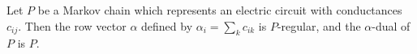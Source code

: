 Let $P$ be a Markov chain which represents an electric circuit with conductances $c_{ij}$. Then the row vector $\alpha$ defined by $\alpha_i = \sum_k c_{ik}$ is $P$-regular, and the $\alpha$-dual of $P$ is $P$.

